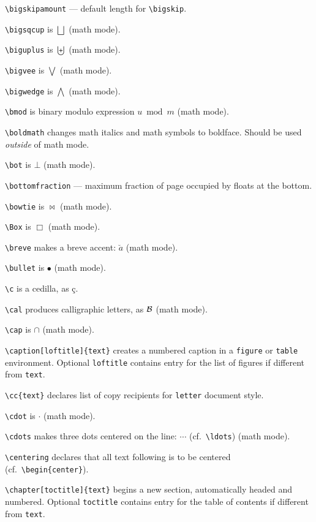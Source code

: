 \verb"\bigskipamount" --- default length for \verb"\bigskip".

\verb"\bigsqcup" is $\bigsqcup$ (math mode).

\verb"\biguplus" is $\biguplus$ (math mode).

\verb"\bigvee" is $\bigvee$ (math mode).

\verb"\bigwedge" is $\bigwedge$ (math mode).

\verb"\bmod" is binary modulo expression $u \bmod m$ (math mode).

\verb"\boldmath" changes math italics and math symbols to boldface.  Should
	be used {\em outside} of math mode.

\verb"\bot" is $\bot$ (math mode).

\verb"\bottomfraction" --- maximum fraction of page occupied by floats at
	the bottom.

\verb"\bowtie" is $\bowtie$ (math mode).

\verb"\Box" is $\Box$ (math mode).

\verb"\breve" makes a breve accent: $\breve a$ (math mode).

\verb"\bullet" is $\bullet$ (math mode).

\verb"\c" is a cedilla, as \c c.

\verb"\cal" produces calligraphic letters, as $\cal B$ (math mode).

\verb"\cap" is $\cap$ (math mode).

\verb"\caption[loftitle]{text}" creates a numbered caption in a \verb"figure"
	or \verb"table" environment. Optional \verb"loftitle" contains
	entry for the list of figures if different from \verb"text".

\verb"\cc{text}" declares list of copy recipients for \verb"letter"
	document style.

\verb"\cdot" is $\cdot$ (math mode).

\verb"\cdots" makes three dots centered on the line: $\cdots$
	(cf.\ \verb"\ldots") (math mode).

\verb"\centering" declares that all text following is to be centered
	(cf.\ \verb"\begin{center}").

\verb"\chapter[toctitle]{text}" begins a new section, automatically headed and
	numbered.  Optional \verb"toctitle" contains entry for the
	table of contents if different from \verb"text".

